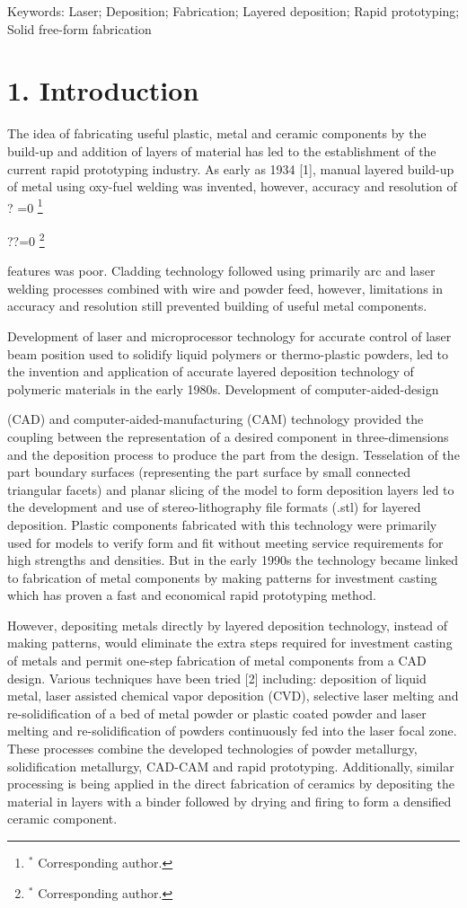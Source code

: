 \documentclass[10pt]{article}
\let\svthefootnote\thefootnote
\newcommand\blfootnotetext[1]{%
  \let\thefootnote\relax\footnote{#1}%
  \addtocounter{footnote}{-1}%
  \let\thefootnote\svthefootnote%
}
\let\svfootnotetext\footnotetext
\renewcommand\footnotetext[2][?]{%
  \if\relax#1\relax%
    \ifnum\value{footnote}=0\blfootnotetext{#2}\else\svfootnotetext{#2}\fi%
  \else%
    \if?#1\ifnum\value{footnote}=0\blfootnotetext{#2}\else\svfootnotetext{#2}\fi%
    \else\svfootnotetext[#1]{#2}\fi%
  \fi
}
\begin{document}
Keywords: Laser; Deposition; Fabrication; Layered deposition; Rapid prototyping; Solid free-form fabrication

\section*{1. Introduction}
The idea of fabricating useful plastic, metal and ceramic components by the build-up and addition of layers of material has led to the establishment of the current rapid prototyping industry. As early as 1934 [1], manual layered build-up of metal using oxy-fuel welding was invented, however, accuracy and resolution of

features was poor. Cladding technology followed using primarily arc and laser welding processes combined with wire and powder feed, however, limitations in accuracy and resolution still prevented building of useful metal components.

Development of laser and microprocessor technology for accurate control of laser beam position used to solidify liquid polymers or thermo-plastic powders, led to the invention and application of accurate layered deposition technology of polymeric materials in the early 1980s. Development of computer-aided-design

(CAD) and computer-aided-manufacturing (CAM) technology provided the coupling between the representation of a desired component in three-dimensions and the deposition process to produce the part from the design. Tesselation of the part boundary surfaces (representing the part surface by small connected triangular facets) and planar slicing of the model to form deposition layers led to the development and use of stereo-lithography file formats (.stl) for layered deposition. Plastic components fabricated with this technology were primarily used for models to verify form and fit without meeting service requirements for high strengths and densities. But in the early 1990s the technology became linked to fabrication of metal components by making patterns for investment casting which has proven a fast and economical rapid prototyping method.

However, depositing metals directly by layered deposition technology, instead of making patterns, would eliminate the extra steps required for investment casting of metals and permit one-step fabrication of metal components from a CAD design. Various techniques have been tried [2] including: deposition of liquid metal, laser assisted chemical vapor deposition (CVD), selective laser melting and re-solidification of a bed of metal powder or plastic coated powder and laser melting and re-solidification of powders continuously fed into the laser focal zone. These processes combine the developed technologies of powder metallurgy, solidification metallurgy, CAD-CAM and rapid prototyping. Additionally, similar processing is being applied in the direct fabrication of ceramics by depositing the material in layers with a binder followed by drying and firing to form a densified ceramic component.
\end{document}
